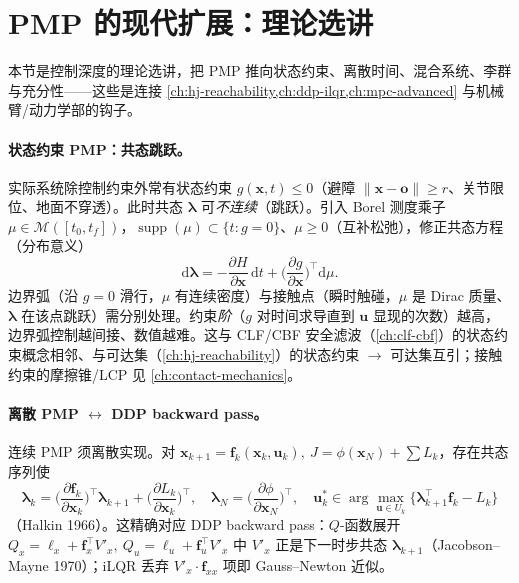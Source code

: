 \section{PMP 的现代扩展：理论选讲}
\label{sec:pmp-extensions}

本节是控制深度的理论选讲，把 PMP 推向状态约束、离散时间、混合系统、李群与充分性——这些是连接 \cref{ch:hj-reachability,ch:ddp-ilqr,ch:mpc-advanced} 与机械臂/动力学部的钩子。

\paragraph{状态约束 PMP：共态跳跃。}
实际系统除控制约束外常有状态约束 $g(\mathbf x,t)\le0$（避障 $\|\mathbf x-\mathbf o\|\ge r$、关节限位、地面不穿透）。此时共态 $\boldsymbol\lambda$ 可\emph{不连续}（跳跃）。引入 Borel 测度乘子 $\mu\in\mathcal M([t_0,t_f])$，$\operatorname{supp}(\mu)\subset\{t:g=0\}$、$\mu\ge0$（互补松弛），修正共态方程（分布意义）
\begin{equation}
  \mathrm d\boldsymbol\lambda=-\frac{\partial H}{\partial\mathbf x}\,\mathrm dt+\Big(\frac{\partial g}{\partial\mathbf x}\Big)^{\!\top}\mathrm d\mu.
  \label{eq:pmp-state-constraint}
\end{equation}
边界弧（沿 $g=0$ 滑行，$\mu$ 有连续密度）与接触点（瞬时触碰，$\mu$ 是 Dirac 质量、$\boldsymbol\lambda$ 在该点跳跃）需分别处理\cite{hartl1995survey}。约束\emph{阶}（$g$ 对时间求导直到 $\mathbf u$ 显现的次数）越高，边界弧控制越间接、数值越难。这与 CLF/CBF 安全滤波（\cref{ch:clf-cbf}）的状态约束概念相邻、与可达集（\cref{ch:hj-reachability}）的状态约束 $\to$ 可达集互引；接触约束的摩擦锥/LCP 见 \cref{ch:contact-mechanics}。

\paragraph{离散 PMP $\leftrightarrow$ DDP backward pass。}
连续 PMP 须离散实现。对 $\mathbf x_{k+1}=\mathbf f_k(\mathbf x_k,\mathbf u_k),\ J=\phi(\mathbf x_N)+\sum L_k$，存在共态序列使
\begin{equation}
  \boldsymbol\lambda_k=\Big(\frac{\partial\mathbf f_k}{\partial\mathbf x_k}\Big)^{\!\top}\boldsymbol\lambda_{k+1}+\Big(\frac{\partial L_k}{\partial\mathbf x_k}\Big)^{\!\top},\quad
  \boldsymbol\lambda_N=\Big(\frac{\partial\phi}{\partial\mathbf x_N}\Big)^{\!\top},\quad
  \mathbf u_k^\ast\in\arg\max_{\mathbf u\in U_k}\big\{\boldsymbol\lambda_{k+1}^\top\mathbf f_k-L_k\big\}
  \label{eq:pmp-discrete}
\end{equation}
（Halkin 1966\cite{halkin1966maximum}）。这精确对应 DDP backward pass：$Q$-函数展开 $Q_x=\ell_x+\mathbf f_x^\top V'_x,\ Q_u=\ell_u+\mathbf f_u^\top V'_x$ 中 $V'_x$ 正是下一时步共态 $\boldsymbol\lambda_{k+1}$（Jacobson--Mayne 1970\cite{jacobson1970differential}）；iLQR 丢弃 $V'_x\cdot\mathbf f_{xx}$ 项即 Gauss--Newton 近似。

